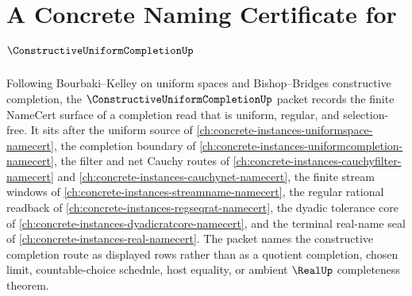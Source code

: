 \chapter{A Concrete Naming Certificate for $\ConstructiveUniformCompletionUp$}
\label{ch:concrete-instances-constructive-uniform-completion-namecert}

Following Bourbaki--Kelley on uniform spaces and Bishop--Bridges constructive completion, the $\ConstructiveUniformCompletionUp$ packet records the finite NameCert surface of a completion read that is uniform, regular, and selection-free. It sits after the uniform source of \autoref{ch:concrete-instances-uniformspace-namecert}, the completion boundary of \autoref{ch:concrete-instances-uniformcompletion-namecert}, the filter and net Cauchy routes of \autoref{ch:concrete-instances-cauchyfilter-namecert} and \autoref{ch:concrete-instances-cauchynet-namecert}, the finite stream windows of \autoref{ch:concrete-instances-streamname-namecert}, the regular rational readback of \autoref{ch:concrete-instances-regseqrat-namecert}, the dyadic tolerance core of \autoref{ch:concrete-instances-dyadicratcore-namecert}, and the terminal real-name seal of \autoref{ch:concrete-instances-real-namecert}. The packet names the constructive completion route as displayed rows rather than as a quotient completion, chosen limit, countable-choice schedule, host equality, or ambient $\RealUp$ completeness theorem.

